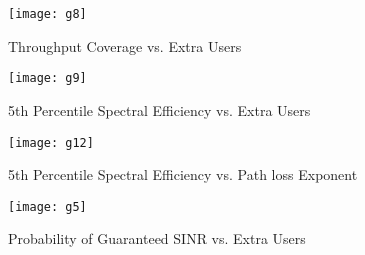 \documentclass[journal]{IEEEtran}
\begin{document}
\begin{figure}[!ht]
\begin{minipage}[t]{0.20\textwidth}
\centering
\texttt{[image: g8]}
\caption{\fontsize{6}{6}\selectfont Throughput Coverage vs. Extra Users}
\label{g4}
\end{minipage}
\hspace{\fill}
\begin{minipage}[t]{0.26\textwidth}
\centering
\texttt{[image: g9]}
\caption{\fontsize{6}{6}\selectfont 5th Percentile Spectral Efficiency vs. Extra Users }
\label{g5}
\end{minipage}
\end{figure}
\begin{figure}[!ht]
\begin{minipage}[t]{0.20\textwidth}
\centering
\texttt{[image: g12]}
\caption{\fontsize{6}{6}\selectfont 5th Percentile Spectral Efficiency vs. Path loss Exponent }
\label{g6}
\end{minipage}
\hspace{\fill}
\begin{minipage}[t]{0.26\textwidth}
\centering
\texttt{[image: g5]}
\caption{\fontsize{6}{6}\selectfont Probability of Guaranteed SINR vs. Extra Users }
\label{g7}
\end{minipage}
\end{figure}
\end{document}
